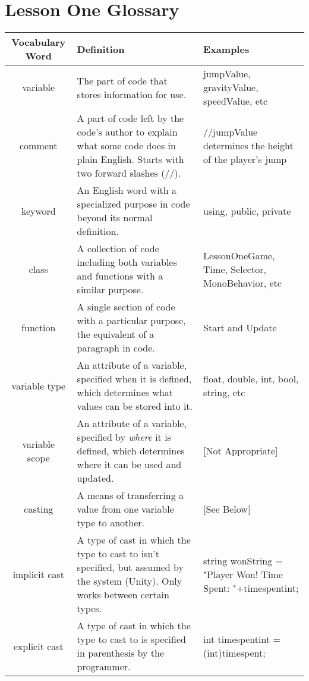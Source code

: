 \documentclass{article}
\begin{document}
\section{Lesson One Glossary}

\begin{center}
\begin{tabular}{ | c | m{5cm}  | m{5cm} | } 
 \hline
 Vocabulary Word & Definition & Examples \\ 
  \hline
 variable & The part of code that stores information for use. & jumpValue, gravityValue, speedValue, etc \\ 
  \hline
 comment & A part of code left by the code's author to explain what some code does in plain English. Starts with two forward slashes (//). & //jumpValue determines the height of the player's jump \\ 
 \hline
 keyword & An English word with a specialized purpose in code beyond its normal definition. & using, public, private \\ 
 \hline
 class & A collection of code including both variables and functions with a similar purpose. & LessonOneGame, Time, Selector, MonoBehavior, etc \\ 
 \hline
  function & A single section of code with a particular purpose, the equivalent of a paragraph in code. & Start and Update \\ 
 \hline
  variable type & An attribute of a variable, specified when it is defined, which determines what values can be stored into it. & float, double, int, bool, string, etc \\ 
 \hline
  variable scope & An attribute of a variable, specified by \textit{where} it is defined, which determines where it can be used and updated. & [Not Appropriate] \\ 
 \hline
   casting & A means of transferring a value from one variable type to another. & [See Below] \\ 
 \hline
  implicit cast & A type of cast in which the type to cast to isn't specified, but assumed by the system (Unity). Only works between certain types. & string wonString = "Player Won! Time Spent: "+timespentint; \\ 
 \hline
  explicit cast & A type of cast in which the type to cast to is specified in parenthesis by the programmer. & \begin{flushleft}int timespentint = (int)timespent;\end{flushleft} \\ 
 \hline
\end{tabular}
\end{center}
\end{document}
